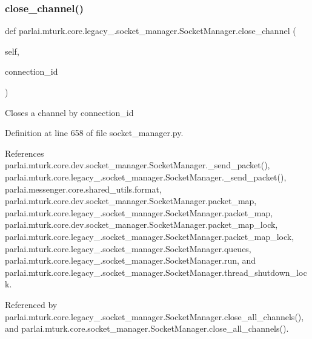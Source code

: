 \subsubsection{\texorpdfstring{close\+\_\+channel()}{close\_channel()}}
{\footnotesize\ttfamily def parlai.\+mturk.\+core.\+legacy\+\_.\+socket\+\_\+manager.\+Socket\+Manager.\+close\+\_\+channel (\begin{DoxyParamCaption}\item[{}]{self,  }\item[{}]{connection\+\_\+id }\end{DoxyParamCaption})}

\begin{DoxyVerb}Closes a channel by connection_id\end{DoxyVerb}
 

Definition at line 658 of file socket\+\_\+manager.\+py.



References parlai.\+mturk.\+core.\+dev.\+socket\+\_\+manager.\+Socket\+Manager.\+\_\+send\+\_\+packet(), parlai.\+mturk.\+core.\+legacy\+\_.\+socket\+\_\+manager.\+Socket\+Manager.\+\_\+send\+\_\+packet(), parlai.\+messenger.\+core.\+shared\+\_\+utils.\+format, parlai.\+mturk.\+core.\+dev.\+socket\+\_\+manager.\+Socket\+Manager.\+packet\+\_\+map, parlai.\+mturk.\+core.\+legacy\+\_.\+socket\+\_\+manager.\+Socket\+Manager.\+packet\+\_\+map, parlai.\+mturk.\+core.\+dev.\+socket\+\_\+manager.\+Socket\+Manager.\+packet\+\_\+map\+\_\+lock, parlai.\+mturk.\+core.\+legacy\+\_.\+socket\+\_\+manager.\+Socket\+Manager.\+packet\+\_\+map\+\_\+lock, parlai.\+mturk.\+core.\+legacy\+\_.\+socket\+\_\+manager.\+Socket\+Manager.\+queues, parlai.\+mturk.\+core.\+legacy\+\_.\+socket\+\_\+manager.\+Socket\+Manager.\+run, and parlai.\+mturk.\+core.\+legacy\+\_.\+socket\+\_\+manager.\+Socket\+Manager.\+thread\+\_\+shutdown\+\_\+lock.



Referenced by parlai.\+mturk.\+core.\+legacy\+\_.\+socket\+\_\+manager.\+Socket\+Manager.\+close\+\_\+all\+\_\+channels(), and parlai.\+mturk.\+core.\+socket\+\_\+manager.\+Socket\+Manager.\+close\+\_\+all\+\_\+channels().

